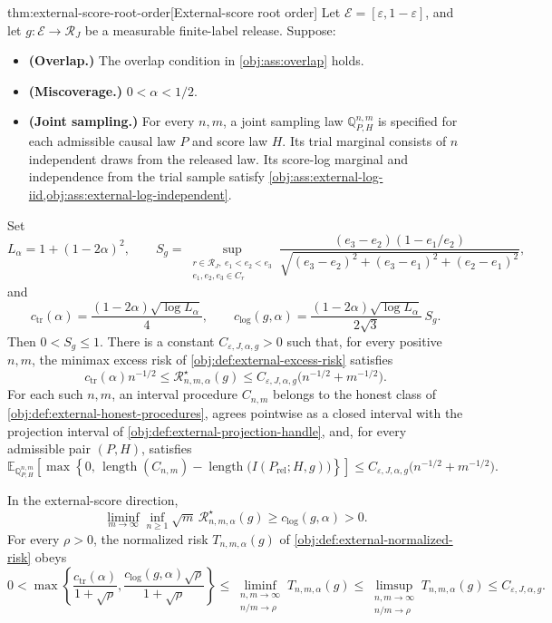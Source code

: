 \begin{theoremv}{thm:external-score-root-order}[External-score root order]
Let \(\mathcal E=[\varepsilon,1-\varepsilon]\), and let \(g:\mathcal E\to\mathcal R_J\) be a measurable finite-label release. Suppose:

\begin{itemize}
\item \textbf{(Overlap.)} The overlap condition in \cref{obj:ass:overlap} holds.
\item \textbf{(Miscoverage.)} \(0<\alpha<1/2\).
\item \textbf{(Joint sampling.)} For every \(n,m\), a joint sampling law \(\mathbb Q_{P,H}^{n,m}\) is specified for each admissible causal law \(P\) and score law \(H\). Its trial marginal consists of \(n\) independent draws from the released law. Its score-log marginal and independence from the trial sample satisfy \cref{obj:ass:external-log-iid,obj:ass:external-log-independent}.
\end{itemize}

Set
\[
L_\alpha=1+(1-2\alpha)^2,\qquad
S_g=
\sup_{\substack{r\in\mathcal R_J,\ e_1<e_2<e_3\\
e_1,e_2,e_3\in C_r}}
\frac{(e_3-e_2)(1-e_1/e_2)}
{\sqrt{(e_3-e_2)^2+(e_3-e_1)^2+(e_2-e_1)^2}},
\]
and
\[
c_{\mathrm{tr}}(\alpha)
=\frac{(1-2\alpha)\sqrt{\log L_\alpha}}{4},
\qquad
c_{\mathrm{log}}(g,\alpha)
=\frac{(1-2\alpha)\sqrt{\log L_\alpha}}{2\sqrt3}\,S_g.
\]
Then \(0<S_g\le 1\). There is a constant \(C_{\varepsilon,J,\alpha,g}>0\) such that, for every positive \(n,m\), the minimax excess risk of \cref{obj:def:external-excess-risk} satisfies
\[
c_{\mathrm{tr}}(\alpha)n^{-1/2}
\le \mathcal R^\star_{n,m,\alpha}(g)
\le C_{\varepsilon,J,\alpha,g}
\bigl(n^{-1/2}+m^{-1/2}\bigr).
\]
For each such \(n,m\), an interval procedure \(C_{n,m}\) belongs to the honest class of \cref{obj:def:external-honest-procedures}, agrees pointwise as a closed interval with the projection interval of \cref{obj:def:external-projection-handle}, and, for every admissible pair \((P,H)\), satisfies
\[
\mathbb E_{\mathbb Q_{P,H}^{n,m}}
\!\left[
\max\!\left\{0,\,
\operatorname{length}(C_{n,m})
-\operatorname{length}\bigl(I(P_{\mathrm{rel}};H,g)\bigr)
\right\}
\right]
\le C_{\varepsilon,J,\alpha,g}
\bigl(n^{-1/2}+m^{-1/2}\bigr).
\]

In the external-score direction,
\[
\liminf_{m\to\infty}\inf_{n\ge1}
\sqrt m\,\mathcal R^\star_{n,m,\alpha}(g)
\ge c_{\mathrm{log}}(g,\alpha)>0.
\]
For every \(\rho>0\), the normalized risk \(T_{n,m,\alpha}(g)\) of \cref{obj:def:external-normalized-risk} obeys
\[
0<
\max\left\{
\frac{c_{\mathrm{tr}}(\alpha)}{1+\sqrt\rho},
\frac{c_{\mathrm{log}}(g,\alpha)\sqrt\rho}{1+\sqrt\rho}
\right\}
\le
\liminf_{\substack{n,m\to\infty\\ n/m\to\rho}}
T_{n,m,\alpha}(g)
\le
\limsup_{\substack{n,m\to\infty\\ n/m\to\rho}}
T_{n,m,\alpha}(g)
\le C_{\varepsilon,J,\alpha,g}.
\]
\end{theoremv}

